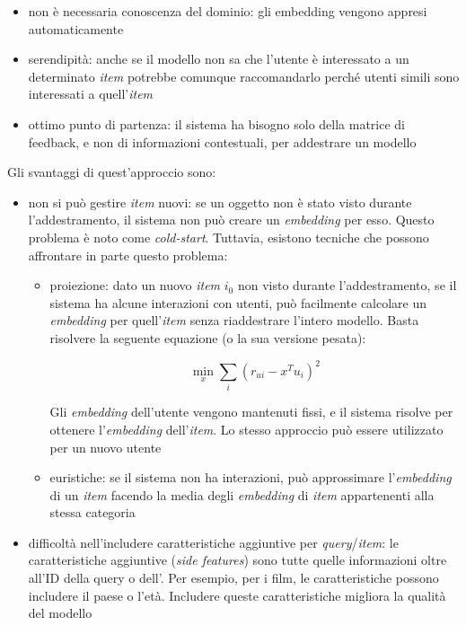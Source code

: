 \begin{itemize}
  \item non è necessaria conoscenza del dominio: gli embedding vengono appresi automaticamente
  \item serendipità: anche se il modello non sa che l'utente è interessato a un determinato \textit{item} potrebbe comunque raccomandarlo perché utenti simili sono interessati a quell'\textit{item}
  \item ottimo punto di partenza: il sistema ha bisogno solo della matrice di feedback, e non di informazioni contestuali, per addestrare un modello
\end{itemize}

Gli svantaggi di quest'approccio sono:

\begin{itemize}
  \item non si può gestire \textit{item} nuovi: se un oggetto non è stato visto durante l'addestramento, il sistema non può creare un \textit{embedding} per esso. Questo problema è noto come \textit{cold-start}. Tuttavia, esistono tecniche che possono affrontare in parte questo problema: 

  \begin{itemize}
    \item proiezione: dato un nuovo \textit{item} $i_0$ non visto durante l'addestramento, se il sistema ha alcune interazioni con utenti, può facilmente calcolare un \textit{embedding} per quell'\textit{item} senza riaddestrare l'intero modello. Basta risolvere la seguente equazione (o la sua versione pesata):

    \[
    \min_x \sum_{i}(r_{ui} - x^T u_i)^2
    \]

    Gli \textit{embedding} dell'utente vengono mantenuti fissi, e il sistema risolve per ottenere l'\textit{embedding} dell'\textit{item}. Lo stesso approccio può essere utilizzato per un nuovo utente
    \item euristiche: se il sistema non ha interazioni, può approssimare l'\textit{embedding} di un \textit{item} facendo la media degli \textit{embedding} di \textit{item} appartenenti alla stessa categoria
  \end{itemize}

  \item difficoltà nell'includere caratteristiche aggiuntive per \textit{query}/\textit{item}: le caratteristiche aggiuntive (\textit{side features}) sono tutte quelle informazioni oltre all'ID della query o dell'. Per esempio, per i film, le caratteristiche possono includere il paese o l'età. Includere queste caratteristiche migliora la qualità del modello


\end{itemize}
